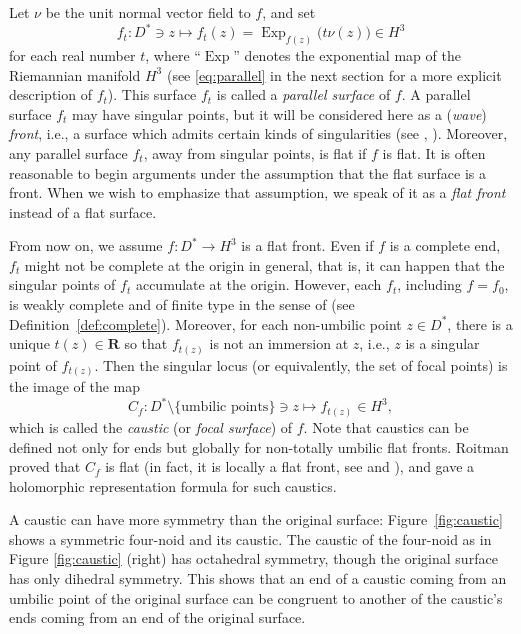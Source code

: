 \documentclass[a4paper]{amsart}
\theoremstyle{plain}
\theoremstyle{remark}
\numberwithin{equation}{section}
\begin{document}
Let $\nu$ be the unit normal vector field to $f$, and set 
\[
    f_t\colon{}D^*\ni z\longmapsto f_t(z) = {\operatorname{Exp}}_{f(z)}
        \bigl(t\nu(z)\bigr)
                \in H^3
\]
for each real number $t$,
where ``${\operatorname{Exp}}$'' denotes the exponential map of the Riemannian manifold
$H^3$
(see \eqref{eq:parallel} in the next section for a more explicit
 description of $f_t$).
This surface $f_t$ is called a {\em parallel surface\/} of $f$.
A parallel surface $f_t$ may have singular points, 
but it will be considered here as a ({\em wave}) {\em front\/}, 
i.e., a surface which admits certain kinds of singularities 
(see \cite{GMM}, \cite{KUY2}).  
Moreover, any parallel surface $f_t$, away from singular points,
 is flat if $f$ is flat. 
It is often reasonable to begin arguments 
under the assumption that the flat surface is a front. 
When we wish to emphasize that assumption, 
we speak of it as a {\it flat front\/} instead of a flat surface.

 From now on, we assume $f\colon D^* \to H^3$ is a flat front.
Even if $f$ is a complete end, 
$f_t$ might not be complete at the origin in general, that is, 
it can happen that the singular points of $f_t$ accumulate at the origin.   
However, each $f_t$, including $f=f_0$, is weakly complete and of finite type
in the sense of \cite{KRUY} 
(see Definition~\ref{def:complete}).
Moreover, for each non-umbilic point $z\in D^*$, 
there is a unique $t(z) \in {\boldsymbol{R}}$ so that
$f_{t(z)}$ is not an immersion at $z$, i.e., $z$ is a singular 
point of $f_{t(z)}$. 
Then the singular locus (or equivalently, the set of focal points) 
is the image of the map
\[
  C_f\colon{} D^*\setminus\{\text{umbilic points}\}\ni
         z\longmapsto f_{t(z)}\in H^3,
\]
which is called the {\it caustic\/} (or {\it focal surface}) of $f$.
Note that caustics can be defined not only for ends but globally for
non-totally umbilic flat fronts.
Roitman \cite{R} proved that $C_f$ is flat 
(in fact, it is locally a flat front, see \cite{KRSUY} and \cite{KRUY}),
and gave a holomorphic representation formula for such caustics. 

A caustic can have more symmetry than the original surface:
Figure~\ref{fig:caustic} shows a symmetric four-noid and its
caustic.
The caustic of the four-noid as in 
Figure \ref{fig:caustic} (right) has octahedral symmetry, 
though the original surface has only dihedral symmetry.
This shows that an end of a caustic coming from an umbilic point 
of the original surface can be
congruent to another of the caustic's ends coming from an end of the
original surface.
\end{document}
